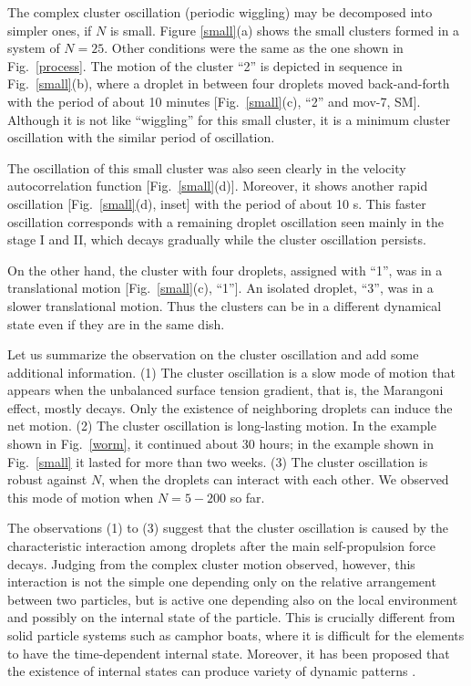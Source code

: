 \documentclass[showpacs]{revtex4-1}
\begin{document}
The complex cluster oscillation (periodic wiggling) may be decomposed
into simpler ones, if $N$ is small. Figure \ref{small}(a) shows the
small clusters formed in a system of $N=25$. Other conditions were the
same as the one shown in Fig.~\ref{process}. The motion of the cluster
``2'' is depicted in sequence in Fig.~\ref{small}(b), where a droplet in
between four droplets moved back-and-forth with the period of about 10
minutes [Fig.~\ref{small}(c), ``2'' and mov-7, SM]. Although it is
not like ``wiggling'' for this small cluster, it is a minimum cluster
oscillation with the similar period of oscillation.

The oscillation of this small cluster was also seen clearly in the
velocity autocorrelation function [Fig.~\ref{small}(d)]. Moreover, it
shows another rapid oscillation [Fig.~\ref{small}(d), inset] with the
period of about 10 s. This faster oscillation corresponds with a
remaining droplet oscillation seen mainly in the stage I and II, which
decays gradually while the cluster oscillation persists.

On the other hand, the cluster with four droplets, assigned with ``1'',
was in a translational motion [Fig.~\ref{small}(c), ``1'']. An isolated
droplet, ``3'', was in a slower translational motion. Thus the
clusters can be in a different dynamical state even if they are in the
same dish.

Let us summarize the observation on the cluster oscillation and add some
additional information. (1) The cluster oscillation is a slow mode of
motion that appears when the unbalanced surface tension gradient, that
is, the Marangoni effect, mostly decays. Only the existence of
neighboring droplets can induce the net motion. (2) The cluster
oscillation is long-lasting motion. In the example shown in
Fig.~\ref{worm}, it continued about 30 hours; in the example shown in
Fig.~\ref{small} it lasted for more than two weeks. (3) The cluster
oscillation is robust against $N$, when the droplets can interact with
each other. We observed this mode of motion when $N=5-200$ so far.

The observations (1) to (3) suggest that the cluster oscillation is
caused by the characteristic interaction among droplets after the main
self-propulsion force decays. Judging from the complex cluster motion
observed, however, this interaction is not the simple one depending only
on the relative arrangement between two particles, but is active one
depending also on the local environment and possibly on the internal
state of the particle. This is crucially different from solid particle
systems such as camphor boats, where it is difficult for the elements to
have the time-dependent internal state. Moreover, it has been proposed
that the existence of internal states can produce variety of dynamic
patterns \cite{Tanaka2007}.
\end{document}
